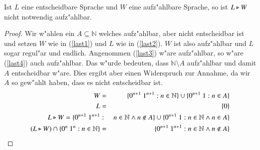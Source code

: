 \begin{satz}
Ist $L$ eine entscheidbare Sprache und $W$ eine aufz"ahlbare Sprache, so ist $L\triangleright W$ nicht notwendig aufz"ahlbar.
\end{satz}
\begin{proof}
Wir w"ahlen ein $A\subseteq \mathbb{N}$ welches aufz"ahlbar, aber nicht entscheidbar ist und
setzen $W$ wie in (\ref{last1}) und $L$ wie in (\ref{last2}). $W$ ist also aufz"ahlbar und $L$ sogar regul"ar und endlich.
Angenommen (\ref{last3}) w"are aufz"ahlbar, so w"are (\ref{last4}) auch aufz"ahlbar. Das w"urde bedeuten, dass $\mathbb{N}\setminus A$ aufz"ahlbar und damit $A$ entscheidbar w"are. Dies ergibt aber einen Widerspruch zur Annahme, da wir $A$ so gew"ahlt haben, dass es nicht entscheidbar ist.
\setcounter{equation}{0}
\begin{eqnarray}
W&=&\{0^{n+1}\ 1^{n+1} : n\in \mathbb{N} \} \cup \{0^{n+1}\ 1 : n\in A \} \label{last1} \\
L&=&\{0\} \label{last2} \\
L\ff W = \{0^{n+1}\ 1^{n+1} &:& n\in\mathbb{N} \wedge n\notin A\} \cup \{0^{n+1}\ 1:n\in \mathbb{N} \wedge n\in A\} \label{last3} \\
(L\ff W)\cap \{0^n\ 1^n : n\in \mathbb{N}\} &=& \{0^{n+1}\ 1^{n+1} : n\in \mathbb{N} \wedge n\notin A\} \label{last4} 
\end{eqnarray}
\end{proof}
